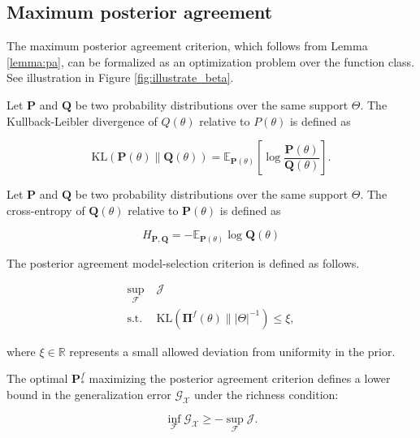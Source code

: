 \subsection{Maximum posterior agreement}

The maximum posterior agreement criterion, which follows 
from Lemma \ref{lemma:pa}, can be formalized as an optimization problem over the 
function class. See illustration in Figure \ref{fig:illustrate_beta}.

\begin{definition}
    Let $\mathbf{P}$ and $\mathbf{Q}$ be two probability distributions over the same support $\Theta$. 
    The Kullback-Leibler divergence of $Q(\theta)$ relative to $P(\theta)$ is defined as

    $$
    \text{KL}(\mathbf{P}(\theta) \parallel \mathbf{Q}(\theta)) = \mathbb{E}_{\mathbf{P}(\theta)} \left[ \log \frac{\mathbf{P}(\theta)}{\mathbf{Q}(\theta)} \right].
    $$

\end{definition} 

\begin{definition}
    Let $\mathbf{P}$ and $\mathbf{Q}$ be two probability distributions over the same support $\Theta$. 
    The cross-entropy of $\mathbf{Q}(\theta)$ relative to $\mathbf{P}(\theta)$ is defined as

    $$
    H_{\mathbf{P}, \mathbf{Q}} = - \mathbb{E}_{\mathbf{P}(\theta)} \log \mathbf{Q}(\theta)
    $$

\end{definition}

\begin{proposition}\label{def:pa}
    The posterior agreement model-selection criterion is defined as follows.

    $$
    \begin{aligned}
        \sup_{\mathcal{F}} & \; \mathcal{J} \\
        \text{s.t.} & \; \text{KL}(\mathbf{\Pi}^f(\theta) \parallel |\Theta|^{-1}) \leq \xi,
    \end{aligned}
    $$
    
    where $\xi \in \mathbb{R}$ represents a small allowed deviation from uniformity in the prior.
\end{proposition}

\begin{theorem}
The optimal $\mathbf{P}_{*}^f$ maximizing the posterior agreement criterion defines a lower bound
in the generalization error $\mathcal{G}_{\mathcal{X}}$ under the richness condition:

$$
    \inf_{\mathcal{F}} \mathcal{G}_{\mathcal{X}} \geq -\sup_{\mathcal{F}} \mathcal{J}.
$$
\end{theorem}

